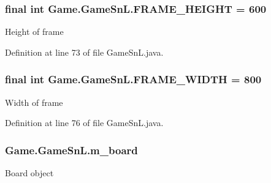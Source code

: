 \hypertarget{class_game_1_1_game_sn_l_a624c7a8a2f8d296257239b8003a5dafd}{}
\subsubsection[{F\+R\+A\+M\+E\+\_\+\+H\+E\+I\+G\+H\+T}]{\setlength{\rightskip}{0pt plus 5cm}final int Game.\+Game\+Sn\+L.\+F\+R\+A\+M\+E\+\_\+\+H\+E\+I\+G\+H\+T = 600\hspace{0.3cm}{\ttfamily [private]}}\label{class_game_1_1_game_sn_l_a624c7a8a2f8d296257239b8003a5dafd}
Height of frame 

Definition at line 73 of file Game\+Sn\+L.\+java.

\hypertarget{class_game_1_1_game_sn_l_afdca372266402cff76e7713cb7141ad6}{}
\subsubsection[{F\+R\+A\+M\+E\+\_\+\+W\+I\+D\+T\+H}]{\setlength{\rightskip}{0pt plus 5cm}final int Game.\+Game\+Sn\+L.\+F\+R\+A\+M\+E\+\_\+\+W\+I\+D\+T\+H = 800\hspace{0.3cm}{\ttfamily [private]}}\label{class_game_1_1_game_sn_l_afdca372266402cff76e7713cb7141ad6}
Width of frame 

Definition at line 76 of file Game\+Sn\+L.\+java.

\hypertarget{class_game_1_1_game_sn_l_a9cb06e53592cfc48ca485c25ab9c1e42}{}
\subsubsection[{m\+\_\+board}]{ Game.\+Game\+Sn\+L.\+m\+\_\+board\hspace{0.3cm}{\ttfamily [private]}}\label{class_game_1_1_game_sn_l_a9cb06e53592cfc48ca485c25ab9c1e42}
Board object 

